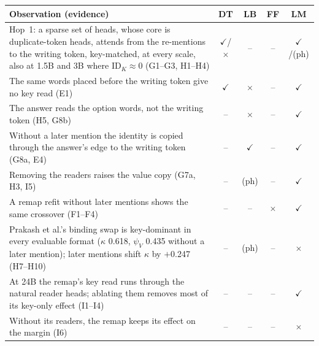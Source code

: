 \begin{tabular}{@{}p{}cccc@{}}
\toprule
Observation (evidence) & DT & LB & FF & LM \\
\midrule
Hop~1: a sparse set of heads, whose core is duplicate-token heads, attends from the re-mentions to the writing token, key-matched, at every scale, also at 1.5B and 3B where $\mathrm{ID}_K \approx 0$ (G1--G3, H1--H4) & $\checkmark$/$\times$ & -- & -- & $\checkmark$/(ph) \\
The same words placed before the writing token give no key read (E1) & $\checkmark$ & $\times$ & -- & $\checkmark$ \\
The answer reads the option words, not the writing token (H5, G8b) & -- & $\times$ & -- & $\checkmark$ \\
Without a later mention the identity is copied through the answer's edge to the writing token (G8a, E4) & -- & $\checkmark$ & -- & $\checkmark$ \\
Removing the readers raises the value copy (G7a, H3, I5) & -- & (ph) & -- & $\checkmark$ \\
A remap refit without later mentions shows the same crossover (F1--F4) & -- & -- & $\times$ & $\checkmark$ \\
Prakash et al.'s binding swap is key-dominant in every evaluable format ($\kappa$ 0.618, $\psi_V$ 0.435 without a later mention); later mentions shift $\kappa$ by $+$0.247 (H7--H10) & -- & (ph) & -- & $\times$ \\
At 24B the remap's key read runs through the natural reader heads; ablating them removes most of its key-only effect (I1--I4) & -- & -- & -- & $\checkmark$ \\
Without its readers, the remap keeps its effect on the margin (I6) & -- & -- & -- & $\times$ \\
\bottomrule
\end{tabular}
